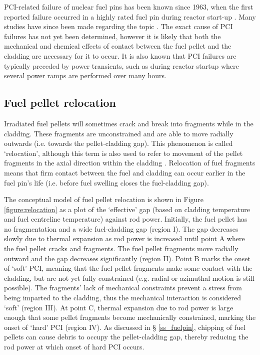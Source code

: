 PCI-related failure of nuclear fuel pins has been known since 1963, when the first reported failure occurred in a highly rated fuel pin during reactor start-up \cite{lyons1963high}. Many studies have since been made regarding the topic \cite{alam2011review, bcoxpelletclad1990}. The exact cause of PCI failures has not yet been determined, however it is likely that both the mechanical and chemical effects of contact between the fuel pellet and the cladding are necessary for it to occur. It is also known that PCI failures are typically preceded by power transients, such as during reactor startup where several power ramps are performed over many hours.

\subsection{Fuel pellet relocation}

Irradiated fuel pellets will sometimes crack and break into fragments while in the cladding. These fragments are unconstrained and are able to move radially outwards (i.e. towards the pellet-cladding gap). This phenomenon is called `relocation', although this term is also used to refer to movement of the pellet fragments in the axial direction within the cladding \cite{sheppard1982data}. Relocation of fuel fragments means that firm contact between the fuel and cladding can occur earlier in the fuel pin's life (i.e. before fuel swelling closes the fuel-cladding gap).

The conceptual model of fuel pellet relocation is shown in Figure \ref{figure:relocation} as a plot of the `effective' gap (based on cladding temperature and fuel centreline temperature) against rod power. Initially, the fuel pellet has no fragmentation and a wide fuel-cladding gap (region I). The gap decreases slowly due to thermal expansion as rod power is increased until point A where the fuel pellet cracks and fragments. The fuel pellet fragments move radially outward and the gap decreases significantly (region II). Point B marks the onset of `soft' PCI, meaning that the fuel pellet fragments make some contact with the cladding, but are not yet fully constrained (e.g. radial or azimuthal motion is still possible). The fragments' lack of mechanical constraints prevent a stress from being imparted to the cladding, thus the mechanical interaction is considered `soft' (region III). At point C, thermal expansion due to rod power is large enough that some pellet fragments become mechanically constrained, marking the onset of `hard' PCI (region IV). As discussed in § \ref{ss_fuelpin}, chipping of fuel pellets can cause debris to occupy the pellet-cladding gap, thereby reducing the rod power at which onset of hard PCI occurs.

